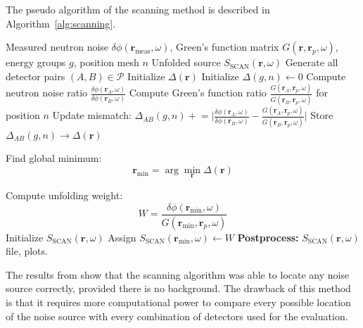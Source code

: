The pseudo algorithm of the scanning method is described in Algorithm~\ref{alg:scanning}.
\begin{algorithm}[H]
\caption{: Scanning Method}
\label{alg:scanning}
\begin{algorithmic}[1]
\Require Measured neutron noise $\delta \phi(\textbf{r}_{\text{meas}}, \omega)$, Green’s function matrix $G(\textbf{r}, \textbf{r}_p,\omega)$, energy groups $g$, position mesh $n$
\Ensure Unfolded source $S_{\text{SCAN}}(\textbf{r}, \omega)$
\State Generate all detector pairs $(A,B) \in \mathcal{P}$
\State Initialize $\Delta(\textbf{r})$ 
        \State Initialize $\Delta(g,n) \gets 0$
            \State Compute neutron noise ratio $\frac{\delta \phi (\textbf{r}_{A}, \omega)}{\delta \phi (\textbf{r}_{B}, \omega)}$
            \State Compute Green's function ratio $\frac{G(\textbf{r}_{A}, \textbf{r}_{p},\omega)}{G(\textbf{r}_{B}, \textbf{r}_{p},\omega)}$ for position $n$
            \State Update mismatch: $\Delta_{AB}(g,n) \mathrel{+}= \biggl| \frac{\delta \phi (\textbf{r}_{A}, \omega)}{\delta \phi (\textbf{r}_{B}, \omega)} - \frac{G(\textbf{r}_{A}, \textbf{r}_{p},\omega)}{G(\textbf{r}_{B}, \textbf{r}_{p},\omega)} \biggr|$
        \EndFor
        \State Store $\Delta_{AB}(g,n) \rightarrow \Delta(\textbf{r})$
    \EndFor
\EndFor

\State Find global minimum: 
\[
\textbf{r}_\text{min} = \arg\min_{\textbf{r}} \Delta(\textbf{r})
\]

\State Compute unfolding weight:
\[
W = \frac{\delta \phi (\textbf{r}_\text{min}, \omega)}{G(\textbf{r}_\text{min}, \textbf{r}_{p},\omega)}
\]
\State Initialize $S_{\text{SCAN}}(\textbf{r}, \omega)$ 
\State Assign $S_{\text{SCAN}}(\textbf{r}_\text{min}, \omega) \gets W$
\State \textbf{Postprocess:} $S_{\text{SCAN}}(\textbf{r}, \omega)$ file, plots. 
\end{algorithmic}
\end{algorithm}

The results from \cite{demaziereIdentificationLocalizationAbsorbers2005} show that the scanning algorithm was able to locate any noise source correctly, provided there is no background. The drawback of this method is that it requires more computational power to compare every possible location of the noise source with every combination of detectors used for the evaluation.

